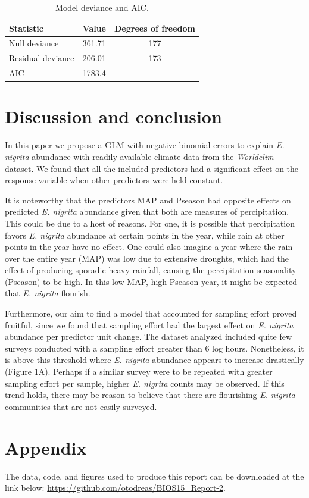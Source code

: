 \documentclass{article}
\begin{document}
\begin{table}[h!]
\centering
\caption{Model deviance and AIC.}

\begin{tabular}{l S[table-format=3.2] S[table-format=3.0]}
\toprule
Statistic & {Value} & {Degrees of freedom} \\
\midrule
Null deviance      & 361.71 & 177 \\
Residual deviance  & 206.01 & 173 \\
AIC                & 1783.4 & {} \\
\bottomrule
\end{tabular}

\end{table}

\section{Discussion and conclusion}

In this paper we propose a GLM with negative binomial errors to explain \textit{E. nigrita} abundance with readily available climate data from the \textit{Worldclim} dataset. We found that all the included predictors had a significant effect on the response variable when other predictors were held constant.

It is noteworthy that the predictors MAP and Pseason had opposite effects on predicted \textit{E. nigrita} abundance given that both are measures of percipitation. This could be due to a host of reasons. For one, it is possible that percipitation favors \textit{E. nigrita} abundance at certain points in the year, while rain at other points in the year have no effect. One could also imagine a year where the rain over the entire year (MAP) was low due to extensive droughts, which had the effect of producing sporadic heavy rainfall, causing the percipitation seasonality (Pseason) to be high. In this low MAP, high Pseason year, it might be expected that \textit{E. nigrita} flourish.

Furthermore, our aim to find a model that accounted for sampling effort proved fruitful, since we found that sampling effort had the largest effect on \textit{E. nigrita} abundance per predictor unit change. The dataset analyzed included quite few surveys conducted with a sampling effort greater than 6 log hours. Nonetheless, it is above this threshold where \textit{E. nigrita} abundance appears to increase drastically (Figure 1A). Perhaps if a similar survey were to be repeated with greater sampling effort per sample, higher \textit{E. nigrita} counts may be observed. If this trend holds, there may be reason to believe that there are flourishing \textit{E. nigrita} communities that are not easily surveyed.

\section{Appendix}

The data, code, and figures used to produce this report can be downloaded at the link below:
\url{https://github.com/otodreas/BIOS15_Report-2}.
\end{document}
